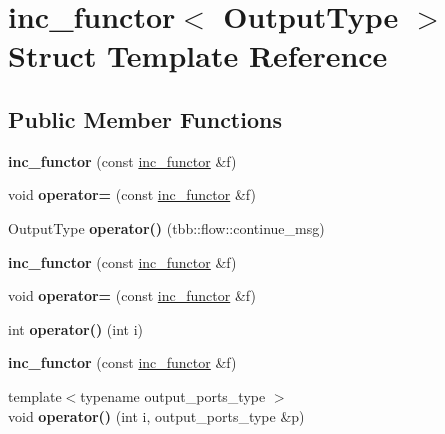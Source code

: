 \hypertarget{structinc__functor}{}\section{inc\+\_\+functor$<$ Output\+Type $>$ Struct Template Reference}
\label{structinc__functor}
\subsection*{Public Member Functions}
\begin{DoxyCompactItemize}
\item 
\hypertarget{structinc__functor_a27c738867bbc30a6757701c356e2e15b}{}{\bfseries inc\+\_\+functor} (const \hyperlink{structinc__functor}{inc\+\_\+functor} \&f)\label{structinc__functor_a27c738867bbc30a6757701c356e2e15b}

\item 
\hypertarget{structinc__functor_a9bdb1af94e310215b9c3d4ac461c8da7}{}void {\bfseries operator=} (const \hyperlink{structinc__functor}{inc\+\_\+functor} \&f)\label{structinc__functor_a9bdb1af94e310215b9c3d4ac461c8da7}

\item 
\hypertarget{structinc__functor_a3c5c62bf0c95ff4c6900aa7c82439bb9}{}Output\+Type {\bfseries operator()} (tbb\+::flow\+::continue\+\_\+msg)\label{structinc__functor_a3c5c62bf0c95ff4c6900aa7c82439bb9}

\item 
\hypertarget{structinc__functor_a27c738867bbc30a6757701c356e2e15b}{}{\bfseries inc\+\_\+functor} (const \hyperlink{structinc__functor}{inc\+\_\+functor} \&f)\label{structinc__functor_a27c738867bbc30a6757701c356e2e15b}

\item 
\hypertarget{structinc__functor_a9bdb1af94e310215b9c3d4ac461c8da7}{}void {\bfseries operator=} (const \hyperlink{structinc__functor}{inc\+\_\+functor} \&f)\label{structinc__functor_a9bdb1af94e310215b9c3d4ac461c8da7}

\item 
\hypertarget{structinc__functor_a56ec3b55dad4bb19fa49e12fcfdf064e}{}int {\bfseries operator()} (int i)\label{structinc__functor_a56ec3b55dad4bb19fa49e12fcfdf064e}

\item 
\hypertarget{structinc__functor_a27c738867bbc30a6757701c356e2e15b}{}{\bfseries inc\+\_\+functor} (const \hyperlink{structinc__functor}{inc\+\_\+functor} \&f)\label{structinc__functor_a27c738867bbc30a6757701c356e2e15b}

\item 
\hypertarget{structinc__functor_a7fdae70e907d6d1842ba20442be88a00}{}{\footnotesize template$<$typename output\+\_\+ports\+\_\+type $>$ }\\void {\bfseries operator()} (int i, output\+\_\+ports\+\_\+type \&p)\label{structinc__functor_a7fdae70e907d6d1842ba20442be88a00}

\end{DoxyCompactItemize}
